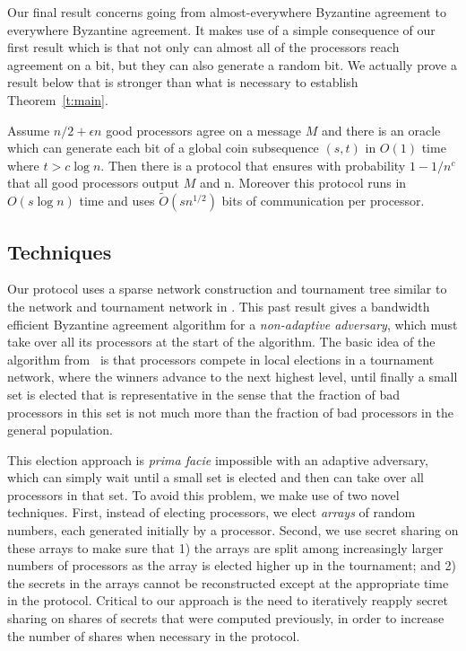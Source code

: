 \documentclass{sig-alternate}
\begin{document}
Our final result concerns going from almost-everywhere Byzantine agreement to everywhere Byzantine agreement.  It makes use of a simple consequence of our first result which is that not only can almost all of the processors reach agreement on a bit, but they can also generate a random bit.  We actually prove a result below that is stronger than what is necessary to establish Theorem~\ref{t:main}.

\begin{theorem}\label{t:ae2e}
Assume $n/2 + \epsilon n$ good processors agree on a message $M$ and there is an oracle which can generate each bit of a global coin subsequence $(s,t)$ in $O(1)$ time where $t > c\log n$. Then  there is a protocol that ensures with probability $1-1/n^c$  that all good processors output $M$ and n.  Moreover this protocol runs in $O(s \log n)$ time and uses $\tilde{O}( s n^{1/2})$ bits of communication per processor.
\end{theorem} 


\subsection{Techniques}

Our protocol uses a sparse network construction and tournament tree similar to the network and tournament network in \cite{KSSV}.  This past result gives a bandwidth efficient Byzantine agreement algorithm for a \emph{non-adaptive adversary},  which must take over all its processors at the start of the algorithm.  The basic idea of the algorithm from~\cite{KSSV} is that processors compete in local elections in a tournament network, where the winners advance to the next highest level, until finally a small set is elected that is representative in the sense that the fraction of bad processors in this set is not much more than the fraction of bad processors in the general population.

This election approach is \emph{prima facie} impossible with an adaptive adversary, which can simply wait until a small set is elected and then can take over all processors in that set.  To avoid this problem, we make use of two novel techniques.  First, instead of electing processors, we elect \emph{arrays} of random numbers, each generated initially by a processor.  Second, we use secret sharing on these arrays to make sure that 1) the arrays are split among increasingly larger numbers of processors as the array is elected higher up in the tournament; and 2) the secrets in the arrays cannot be reconstructed except at the appropriate time in the protocol.  Critical to our approach is the need to iteratively reapply secret sharing on shares of secrets that were computed previously, in order to increase the number of shares when necessary in the protocol.
\end{document}
